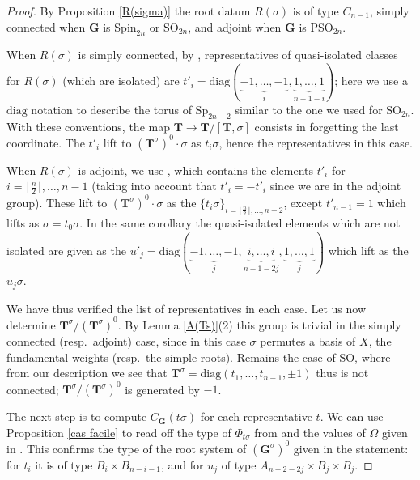 \documentclass{amsart}
\numberwithin{equation}{section}
\theoremstyle{definition}
\theoremstyle{remark}
\newcommand\bG{{\mathbf G}}
\newcommand\bT{{\mathbf T}}
\newcommand\Gs{{\bG^\sigma}}
\newcommand\Gso{{(\Gs)^0}}
\newcommand\Tso{{(\bT^\sigma)^0}}
\newcommand\Ts{{\bT^\sigma}}
\newcommand\LT{{\bT/[\bT,\sigma]}}
\newcommand\PSO{\mathrm{PSO}}
\newcommand\SO{\mathrm{SO}}
\newcommand\Sp{\mathrm{Sp}}
\newcommand\Spin{\mathrm{Spin}}
\newcommand\diag{\mathrm{diag}}
\begin{document}
\begin{proof}
By Proposition \ref{R(sigma)} the root datum $R(\sigma)$ is of type $C_{n-1}$,
simply connected when $\bG$ is $\Spin_{2n}$ or $\SO_{2n}$, and adjoint when $\bG$ is
$\PSO_{2n}$.

When $R(\sigma)$ is simply connected, by \cite[4.10]{cedric}, representatives of
quasi-isolated classes for $R(\sigma)$ (which are isolated) are
$t'_i=\diag(\underbrace{-1,\ldots,-1}_i,
\underbrace{1,\ldots,1}_{n-1-i})$; here we use a $\diag$ notation to describe
the torus of $\Sp_{2n-2}$ similar to the one we used for $\SO_{2n}$. With these conventions,
the map $\bT\to\LT$ consists in forgetting the last coordinate.
The $t'_i$ lift to $\Tso\cdot\sigma$ as $t_i\sigma$, hence the
representatives in this case.

When $R(\sigma)$ is adjoint, we
use \cite[corollary 5.4]{cedric}, which contains the
elements $t'_i$ for $i=\lfloor\frac n2\rfloor,\ldots,n-1$ (taking into account
that $t'_i=-t'_i$ since we are in the adjoint group). These lift to
$\Tso\cdot\sigma$ as
the $\{t_i\sigma\}_{i=\lfloor\frac n2\rfloor,\ldots,n-2}$, except 
$t'_{n-1}=1$ which lifts as $\sigma=t_0\sigma$. 
In the same corollary the quasi-isolated elements
which are not isolated are given as the
$u'_j=\diag(\underbrace{-1,\ldots,-1}_j,
\underbrace{i,\ldots,i}_{n-1-2j},\underbrace{1,\ldots,1}_j)$ which lift as the
$u_j\sigma$.

We have thus verified the list of representatives in each case. Let us now
determine $\Ts/\Tso$. By Lemma \ref{A(Ts)}(2) this group is trivial in the simply
connected (resp.~adjoint) case, since in this case $\sigma$ permutes a basis
of $X$, the fundamental weights  (resp.~the simple roots). Remains the case of $\SO$,
where from our description we see that $\Ts=\diag(t_1,\ldots,t_{n-1},\pm 1)$
thus is not connected; $\Ts/\Tso$ is generated by $-1$.

The next step is to compute $C_\bG(t\sigma)$ for each representative $t$.
We can use Proposition \ref{cas facile} to read 
off the type of $\Phi_{t\sigma}$ from
\cite[Theorem 5.1(b)($\alpha$)]{cedric} and the values of $\Omega$ given
in \cite[example 4.10 and Corollary 5.4]{cedric}. This confirms the type
of the root system of $\Gso$ given in the statement: for $t_i$
it is of type $B_i\times B_{n-i-1}$, and for $u_j$ of type
$A_{n-2-2j}\times B_j\times B_j$.


\end{proof}
\end{document}
